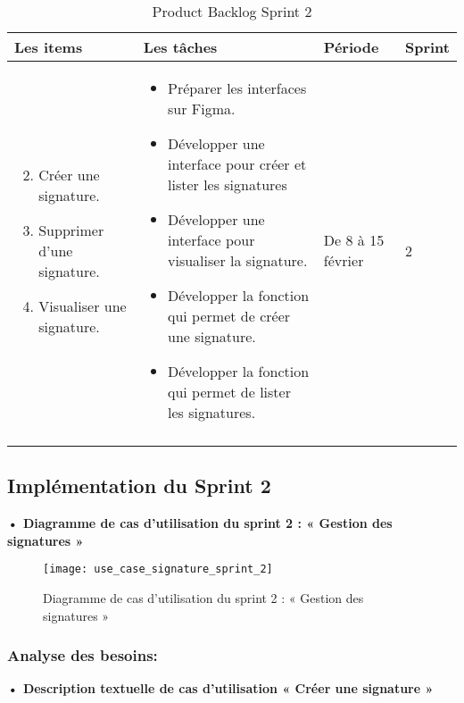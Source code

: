 \begin{longtable}{|p{4cm}|p{7cm}|p{2cm}|p{2cm}|}
  \hline
  \textbf{Les items} &\textbf{Les tâches} & \textbf{Période} & \textbf{Sprint} \\
  \hline
  \vspace{-\baselineskip}
  \begin{enumerate}
    \setcounter{enumi}{1}
    \itemsep0em 
      \item Créer une signature.
      \item Supprimer d'une signature.
      \item Visualiser une signature.

  \end{enumerate}
  &
  \vspace{-\baselineskip}
  \begin{itemize}
    \itemsep0em 
    \item Préparer les interfaces sur Figma.
    \item Développer une interface pour créer et lister les signatures
    \item Développer une interface pour visualiser la signature.
    \item Développer la fonction qui permet de créer une signature.
    \item Développer la fonction qui permet de lister les signatures.
  \end{itemize}
  &
  De 8 à 15 février  
  &
  2
  \\
  \hline
  \caption{Product Backlog Sprint 2}
  \label{tab:product-backlog-sprint-2}


\end{longtable}

\subsection{Implémentation du Sprint 2}
\textbf{•	Diagramme de cas d'utilisation du sprint 2 : « Gestion des signatures »}

\begin{figure}[H]
  \centering
  \texttt{[image: use\_case\_signature\_sprint\_2]}
  \caption{Diagramme de cas d'utilisation du sprint 2 : « Gestion des signatures »}
  \label{fig:UseCaseDiagram}
\end{figure}

\subsubsection{Analyse des besoins:}
\textbf{•	Description textuelle de cas d'utilisation « Créer une signature »}

